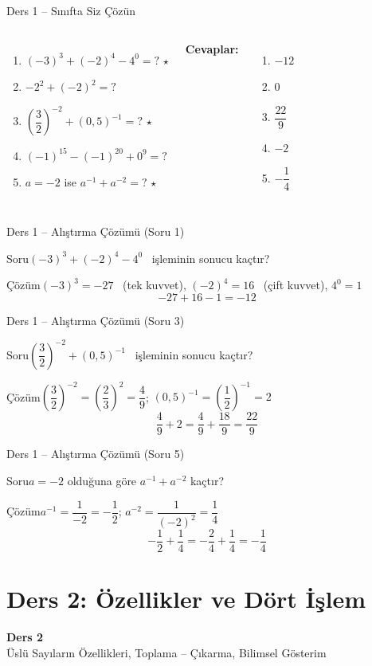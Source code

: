 \documentclass[aspectratio=169,11pt]{beamer}
\newcommand{\soru}[3]{%
\begin{frame}{#1}
  \begin{block}{Soru}\large #2\end{block}
  \pause
  \begin{exampleblock}{Çözüm}\large #3\end{exampleblock}
\end{frame}}
\begin{document}
\begin{frame}{Ders 1 -- Sınıfta Siz Çözün}
\begin{columns}[t]
\begin{enumerate}
\item \((-3)^3+(-2)^4-4^0=?\) \(\star\)
\item \(-2^2+(-2)^2=?\)
\item \(\left(\dfrac32\right)^{-2}+(0{,}5)^{-1}=?\) \(\star\)
\item \((-1)^{15}-(-1)^{20}+0^9=?\)
\item \(a=-2\) ise \(a^{-1}+a^{-2}=?\) \(\star\)
\end{enumerate}
\pause
\textbf{Cevaplar:}
\begin{enumerate}
\item \(-12\)
\item \(0\)
\item \(\dfrac{22}{9}\)
\item \(-2\)
\item \(-\dfrac14\)
\end{enumerate}
\end{columns}
\vspace{4pt}{\footnotesize \(\star\) işaretli soruların adım adım çözümü sonraki slaytlardadır.}
\end{frame}

\soru{Ders 1 -- Alıştırma Çözümü (Soru 1)}
{\((-3)^3+(-2)^4-4^0\) \ işleminin sonucu kaçtır?}
{\((-3)^3=-27\) \ (tek kuvvet), \quad \((-2)^4=16\) \ (çift kuvvet), \quad \(4^0=1\)
\[-27+16-1=-12\]}

\soru{Ders 1 -- Alıştırma Çözümü (Soru 3)}
{\(\left(\dfrac32\right)^{-2}+(0{,}5)^{-1}\) \ işleminin sonucu kaçtır?}
{\(\left(\dfrac32\right)^{-2}=\left(\dfrac23\right)^{2}=\dfrac49\); \qquad \((0{,}5)^{-1}=\left(\dfrac12\right)^{-1}=2\)
\[\frac49+2=\frac49+\frac{18}{9}=\frac{22}{9}\]}

\soru{Ders 1 -- Alıştırma Çözümü (Soru 5)}
{\(a=-2\) olduğuna göre \(a^{-1}+a^{-2}\) kaçtır?}
{\(a^{-1}=\dfrac{1}{-2}=-\dfrac12\); \qquad \(a^{-2}=\dfrac{1}{(-2)^2}=\dfrac14\)
\[-\frac12+\frac14=-\frac24+\frac14=-\frac14\]}


\section{Ders 2: Özellikler ve Dört İşlem}
\begin{frame}
\centering\Large\color{anamavi}\textbf{Ders 2}\\[6pt]\normalsize Üslü Sayıların Özellikleri, Toplama -- Çıkarma, Bilimsel Gösterim
\end{frame}
\end{document}

